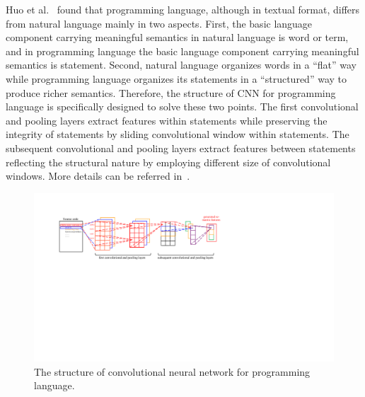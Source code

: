Huo et al.~\cite{huo2016learning} found that programming language, although in textual format, differs from natural language mainly in two aspects. First, the basic language component carrying meaningful semantics in natural language is word or term, and in programming language the basic language component carrying meaningful semantics is statement. Second, natural language organizes words in a ``flat'' way while programming language organizes its statements in a ``structured'' way to produce richer semantics. Therefore, the structure of CNN for programming language is specifically designed to solve these two points. The first convolutional and pooling layers extract features within statements while preserving the integrity of statements by sliding convolutional window within statements. The subsequent convolutional and pooling layers extract features between statements reflecting the structural nature by employing different size of convolutional windows. More details can be referred in~\cite{huo2016learning}.

\begin{figure}[hbt]
\centering
\includegraphics[width = \columnwidth]{pic/NPCNN.pdf}
\caption{The structure of convolutional neural network for programming language.}
\label{fig:npcnn}
\end{figure}

